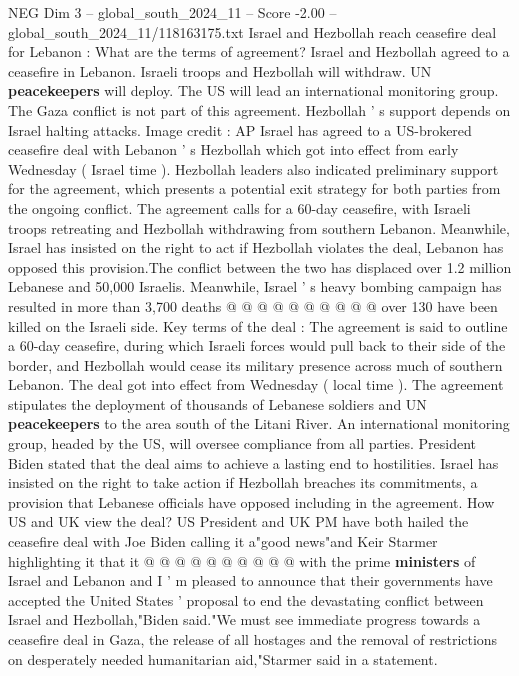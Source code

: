 \begin{textsample}{NEG Dim 3 – global\_south\_2024\_11 – Score -2.00 – global\_south\_2024\_11/118163175.txt}  \label{ex:f3_neg_133}
Israel and Hezbollah reach ceasefire deal for Lebanon : What are the terms of agreement?
Israel and Hezbollah agreed to a ceasefire in Lebanon.
Israeli troops and Hezbollah will withdraw.
UN \textbf{peacekeepers} will deploy.
The US will lead an international monitoring group.
The Gaza conflict is not part of this agreement.
Hezbollah ' s support depends on Israel halting attacks.
Image credit : AP Israel has agreed to a US-brokered ceasefire deal with Lebanon ' s Hezbollah which got into effect from early Wednesday ( Israel time ).
Hezbollah leaders also indicated preliminary support for the agreement, which presents a potential exit strategy for both parties from the ongoing conflict.
The agreement calls for a 60-day ceasefire, with Israeli troops retreating and Hezbollah withdrawing from southern Lebanon.
Meanwhile, Israel has insisted on the right to act if Hezbollah violates the deal, Lebanon has opposed this provision.The conflict between the two has displaced over 1.2 million Lebanese and 50,000 Israelis.
Meanwhile, Israel ' s heavy bombing campaign has resulted in more than 3,700 deaths @ @ @ @ @ @ @ @ @ @ over 130 have been killed on the Israeli side.
Key terms of the deal : The agreement is said to outline a 60-day ceasefire, during which Israeli forces would pull back to their side of the border, and Hezbollah would cease its military presence across much of southern Lebanon.
The deal got into effect from Wednesday ( local time ).
The agreement stipulates the deployment of thousands of Lebanese soldiers and UN \textbf{peacekeepers} to the area south of the Litani River.
An international monitoring group, headed by the US, will oversee compliance from all parties.
President Biden stated that the deal aims to achieve a lasting end to hostilities.
Israel has insisted on the right to take action if Hezbollah breaches its commitments, a provision that Lebanese officials have opposed including in the agreement.
How US and UK view the deal?
US President and UK PM have both hailed the ceasefire deal with Joe Biden calling it a"good news"and Keir Starmer highlighting it that it @ @ @ @ @ @ @ @ @ @ with the prime \textbf{ministers} of Israel and Lebanon and I ' m pleased to announce that their governments have accepted the United States ' proposal to end the devastating conflict between Israel and Hezbollah,"Biden said."We must see immediate progress towards a ceasefire deal in Gaza, the release of all hostages and the removal of restrictions on desperately needed humanitarian aid,"Starmer said in a statement.

\end{textsample}

